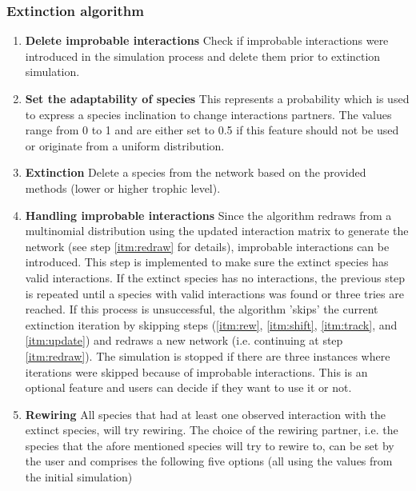 \documentclass[12pt,a4paper]{article}
\begin{document}
\subsubsection{Extinction algorithm} \label{subsec:extc_alg}
\begin{enumerate} 
	\item \textbf{Delete improbable interactions} {\small Check if improbable interactions were introduced in the simulation process and delete them prior to extinction simulation.}
	\item \textbf{Set the adaptability of species} {\small This represents a probability which is used to express a species inclination to change interactions partners. The values range from 0 to 1 and are either set to 0.5 if this feature should not be used or originate from a uniform distribution.}
	\item \label{itm:etxc} \textbf{Extinction} {\small Delete a species from the network based on the provided methods (lower or higher trophic level).}
	\item \label{itm:failsafe} \textbf{Handling improbable interactions} {\small Since the algorithm redraws from a multinomial distribution using the updated interaction matrix to generate the network (see step \ref{itm:redraw} for details), improbable interactions can be introduced. This step is implemented to make sure the extinct species has valid interactions. If the extinct species has no interactions, the previous step is repeated until a species with valid interactions was found or three tries are reached. If this process is unsuccessful, the algorithm 'skips' the current extinction iteration by skipping steps (\ref{itm:rew}, \ref{itm:shift}, \ref{itm:track}, and \ref{itm:update}) and redraws a new network (i.e. continuing at step \ref{itm:redraw}). The simulation is stopped if there are three instances where iterations were skipped because of improbable interactions. This is an optional feature and users can decide if they want to use it or not.}
	\item \label{itm:rew} \textbf{Rewiring} {\small All species that had at least one observed interaction with the extinct species, will try rewiring. The choice of the rewiring partner, i.e. the species that the afore mentioned species will try to rewire to, can be set by the user and comprises the following five options (all using the values from the initial simulation)}

\end{enumerate}
\end{document}
